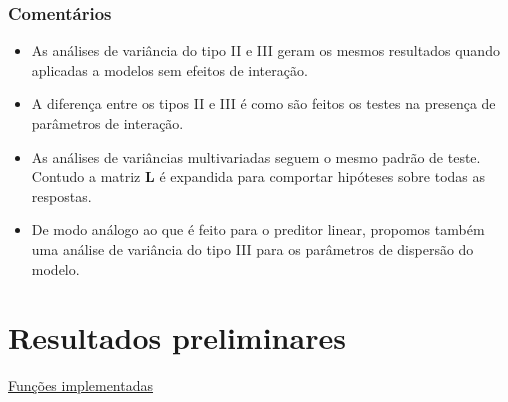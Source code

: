 \documentclass[10pt,
  aspectratio=169,
  serif,
  mathserif,
  professionalfont,
  compress,
  handout,
  ]{beamer}\usepackage[]{graphicx}\usepackage[]{color}
\begin{document}

\begin{frame}

\frametitle{Comentários}

\begin{itemize}
   \itemsep 2ex
   
  \item As análises de variância do tipo II e III geram os mesmos resultados quando aplicadas a modelos sem efeitos de interação. 
  
  \item A diferença entre os tipos II e III é como são feitos os testes na presença de parâmetros de interação.
  
  \item As análises de variâncias multivariadas seguem o mesmo padrão de teste. Contudo a matriz $\boldsymbol{L}$ é expandida para comportar hipóteses sobre todas as respostas.
  
  \item De modo análogo ao que é feito para o preditor linear, propomos também uma análise de variância do tipo III para os parâmetros de dispersão do modelo.
  
\end{itemize}

\end{frame}


\section{Resultados preliminares}


\begin{frame}[c, allowframebreaks]

\begin{center}

  {\normalsize \href{https://lineu96.github.io/st/}{Funções implementadas}}
  
\end{center}

\end{frame}

\end{document}
